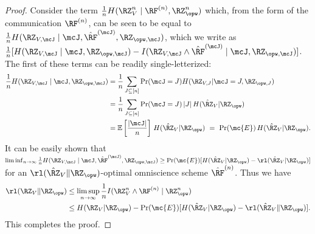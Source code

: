 {\begin{proof}
Consider the term $\frac{1}{n}H(\RZ_V^{n} \mid \RF^{(n)}, \RZ_{\opw}^n)$ which, from the form of the communication $\RF^{(n)}$, can be seen to be equal to $\frac{1}{n}H(\RZ_{V,\mcJ} \mid \mcJ, \hat{\RF}^{(\mcJ)}, \RZ_{\opw,\mcJ})$, which we write as $\frac{1}{n}[H(\RZ_{V,\mcJ} \mid \mcJ, \RZ_{\opw,\mcJ})-I(\RZ_{V,\mcJ} \wedge  \hat{\RF}^{(\mcJ)}\mid \mcJ, \RZ_{\opw,\mcJ})]$. The first of these terms can be readily single-letterized:
\begin{align*}
    \frac{1}{n}H(\RZ_{V,\mcJ} \mid \mcJ, \RZ_{\opw,\mcJ}) &= \frac{1}{n}\sum_{J \subseteq [n]} \Pr(\mcJ = J) H(\RZ_{V,J} | \mcJ = J, \RZ_{\opw,J}) \\
    &= \frac{1}{n}\sum_{J \subseteq [n]} \Pr(\mcJ = J) \, |J| \, H(\hat{\RZ}_V|\RZ_{\opw}) \\
    &= \mathbb{E}\left[\frac{|\mcJ|}{n}\right] \, H(\hat{\RZ}_V|\RZ_{\opw})  \ = \ \Pr(\mc{E}) \, H(\hat{\RZ}_V|\RZ_{\opw}).
\end{align*}
It can be easily shown that $\liminf_{n\to \infty}\frac{1}{n}H(\RZ_{V,\mcJ} \mid \mcJ, \hat{\RF}^{(\mcJ)}, \RZ_{\opw,\mcJ})  \geq  \Pr(\mc{E})[H(\hat{\RZ}_V|\RZ_{\opw})-\rl(\hat{\RZ}_V|\RZ_{\opw})]$ for an $\rl(\hat{\RZ}_V\|\RZ_{\opw})$-optimal omniscience scheme  $\hat{\RF}^{(n)}$.
Thus we have 
\begin{align*}
    \rl(\RZ_V\|\RZ_{\opw}) &\leq \limsup_{n \to \infty} \frac{1}{n} I(\RZ_V^{n} \wedge \RF^{(n)} \mid \RZ_{\opw}^n) \\ & \leq H(\RZ_V|\RZ_{\opw})%
    -\Pr(\mc{E})[H(\hat{\RZ}_V|\RZ_{\opw})-\rl(\hat{\RZ}_V\|\RZ_{\opw})].
\end{align*}
This completes the proof.
\end{proof} 
}






